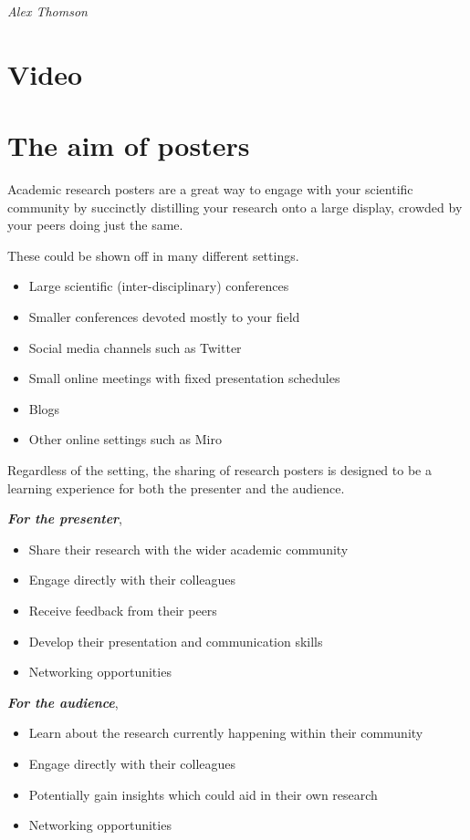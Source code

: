 \documentclass[
]{book}
\providecommand{\tightlist}{%
  \setlength{\itemsep}{0pt}\setlength{\parskip}{0pt}}
\begin{document}
\emph{Alex Thomson}

\hypertarget{video-2}{%
\section{Video}\label{video-2}}

\hypertarget{the-aim-of-posters}{%
\section{The aim of posters}\label{the-aim-of-posters}}

Academic research posters are a great way to engage with your scientific community by succinctly distilling your research onto a large display, crowded by your peers doing just the same.

These could be shown off in many different settings.

\begin{itemize}
\tightlist
\item
  Large scientific (inter-disciplinary) conferences
\item
  Smaller conferences devoted mostly to your field
\item
  Social media channels such as Twitter
\item
  Small online meetings with fixed presentation schedules
\item
  Blogs
\item
  Other online settings such as Miro
\end{itemize}

Regardless of the setting, the sharing of research posters is designed to be a learning experience for both the presenter and the audience.

\textbf{\emph{For the presenter}},

\begin{itemize}
\tightlist
\item
  Share their research with the wider academic community
\item
  Engage directly with their colleagues
\item
  Receive feedback from their peers
\item
  Develop their presentation and communication skills
\item
  Networking opportunities
\end{itemize}

\textbf{\emph{For the audience}},

\begin{itemize}
\tightlist
\item
  Learn about the research currently happening within their community
\item
  Engage directly with their colleagues
\item
  Potentially gain insights which could aid in their own research
\item
  Networking opportunities
\end{itemize}
\end{document}
